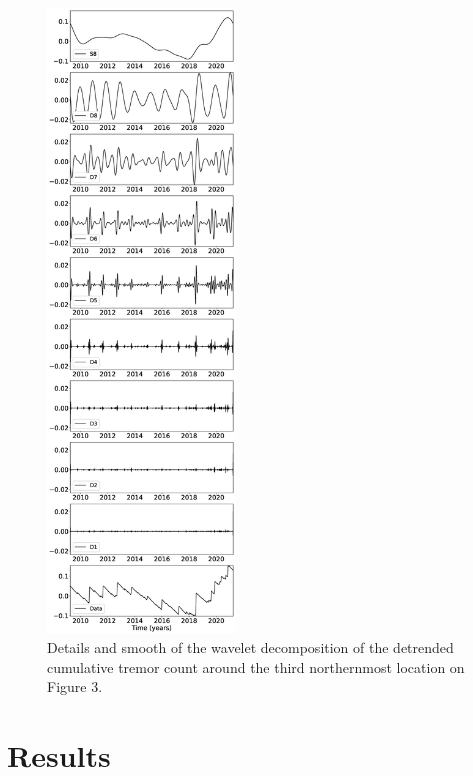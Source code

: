 \documentclass[draft]{agujournal2018}
\begin{document}
\begin{figure}
\noindent\includegraphics[width=5cm, trim={0cm 0cm 0cm 0cm},clip]{figures/tremor_13.eps}
\caption{Details and smooth of the wavelet decomposition of the detrended cumulative tremor count around the third northernmost location on Figure 3.}
\label{pngfiguresample}
\end{figure}

\section{Results}
\end{document}
